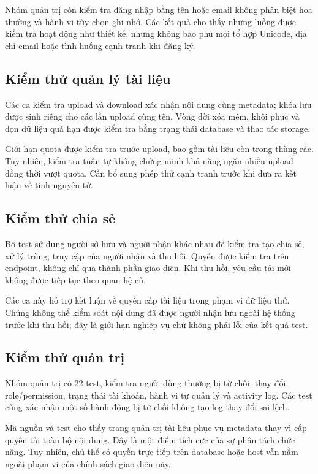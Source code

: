 Nhóm quản trị còn kiểm tra đăng nhập bằng tên hoặc email không phân biệt hoa thường và hành vi tùy chọn ghi nhớ. Các kết quả cho thấy những luồng được kiểm tra hoạt động như thiết kế, nhưng không bao phủ mọi tổ hợp Unicode, địa chỉ email hoặc tình huống cạnh tranh khi đăng ký.
\subsection{Kiểm thử quản lý tài liệu}
Các ca kiểm tra upload và download xác nhận nội dung cùng metadata; khóa lưu được sinh riêng cho các lần upload cùng tên. Vòng đời xóa mềm, khôi phục và dọn dữ liệu quá hạn được kiểm tra bằng trạng thái database và thao tác storage.

Giới hạn quota được kiểm tra trước upload, bao gồm tài liệu còn trong thùng rác. Tuy nhiên, kiểm tra tuần tự không chứng minh khả năng ngăn nhiều upload đồng thời vượt quota. Cần bổ sung phép thử cạnh tranh trước khi đưa ra kết luận về tính nguyên tử.
\subsection{Kiểm thử chia sẻ}
Bộ test sử dụng người sở hữu và người nhận khác nhau để kiểm tra tạo chia sẻ, xử lý trùng, truy cập của người nhận và thu hồi. Quyền được kiểm tra trên endpoint, không chỉ qua thành phần giao diện. Khi thu hồi, yêu cầu tải mới không được tiếp tục theo quan hệ cũ.

Các ca này hỗ trợ kết luận về quyền cấp tài liệu trong phạm vi dữ liệu thử. Chúng không thể kiểm soát nội dung đã được người nhận lưu ngoài hệ thống trước khi thu hồi; đây là giới hạn nghiệp vụ chứ không phải lỗi của kết quả test.
\subsection{Kiểm thử quản trị}
Nhóm quản trị có 22 test, kiểm tra người dùng thường bị từ chối, thay đổi role/permission, trạng thái tài khoản, hành vi tự quản lý và activity log. Các test cũng xác nhận một số hành động bị từ chối không tạo log thay đổi sai lệch.

Mã nguồn và test cho thấy trang quản trị tài liệu phục vụ metadata thay vì cấp quyền tải toàn bộ nội dung. Đây là một điểm tích cực của sự phân tách chức năng. Tuy nhiên, chủ thể có quyền trực tiếp trên database hoặc host vẫn nằm ngoài phạm vi của chính sách giao diện này.

